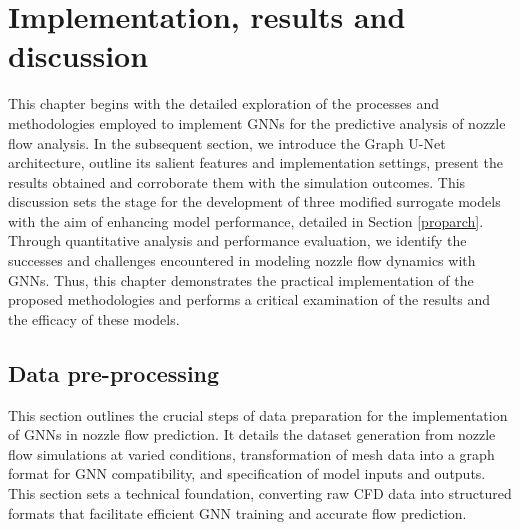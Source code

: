 \chapter{Implementation, results and discussion}
\label{chap:Method}
This chapter begins with the detailed exploration of the processes and methodologies employed to implement GNNs for the predictive analysis of nozzle flow analysis. In the subsequent section, we introduce the Graph U-Net architecture, outline its salient features and implementation settings, present the results obtained and corroborate them with the simulation outcomes. This discussion sets the stage for the development of three modified surrogate models with the aim of enhancing model performance, detailed in Section \ref{proparch}. Through quantitative analysis and performance evaluation, we identify the successes and challenges encountered in modeling nozzle flow dynamics with GNNs. Thus, this chapter demonstrates the practical implementation of the proposed methodologies and performs a critical examination of the results and the efficacy of these models.
\section{Data pre-processing} \label{prep}
This section outlines the crucial steps of data preparation for the implementation of GNNs in nozzle flow prediction. It details the dataset generation from nozzle flow simulations at varied conditions, transformation of mesh data into a graph format for GNN compatibility, and specification of model inputs and outputs. This section sets a technical foundation, converting raw CFD data into structured formats that facilitate efficient GNN training and accurate flow prediction.
